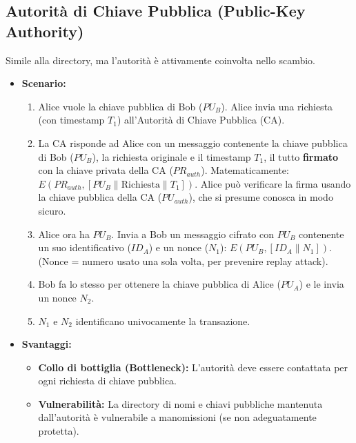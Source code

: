 \documentclass{article}
\begin{document}
\subsection{Autorità di Chiave Pubblica (Public-Key Authority)}
Simile alla directory, ma l'autorità è attivamente coinvolta nello scambio.
\begin{itemize}
    \item \textbf{Scenario:}
        \begin{enumerate}
            \item Alice vuole la chiave pubblica di Bob ($PU_B$). Alice invia una richiesta (con timestamp $T_1$) all'Autorità di Chiave Pubblica (CA).
            \item La CA risponde ad Alice con un messaggio contenente la chiave pubblica di Bob ($PU_B$), la richiesta originale e il timestamp $T_1$, il tutto \textbf{firmato} con la chiave privata della CA ($PR_{auth}$). Matematicamente: $E(PR_{auth}, [PU_B \parallel \text{Richiesta} \parallel T_1])$. Alice può verificare la firma usando la chiave pubblica della CA ($PU_{auth}$), che si presume conosca in modo sicuro.
            \item Alice ora ha $PU_B$. Invia a Bob un messaggio cifrato con $PU_B$ contenente un suo identificativo ($ID_A$) e un nonce ($N_1$): $E(PU_B, [ID_A \parallel N_1])$. (Nonce = numero usato una sola volta, per prevenire replay attack).
            \item Bob fa lo stesso per ottenere la chiave pubblica di Alice ($PU_A$) e le invia un nonce $N_2$.
            \item $N_1$ e $N_2$ identificano univocamente la transazione.
        \end{enumerate}
    \item \textbf{Svantaggi:}
        \begin{itemize}
            \item \textbf{Collo di bottiglia (Bottleneck):} L'autorità deve essere contattata per ogni richiesta di chiave pubblica.
            \item \textbf{Vulnerabilità:} La directory di nomi e chiavi pubbliche mantenuta dall'autorità è vulnerabile a manomissioni (se non adeguatamente protetta).
        \end{itemize}
\end{itemize}
\end{document}
